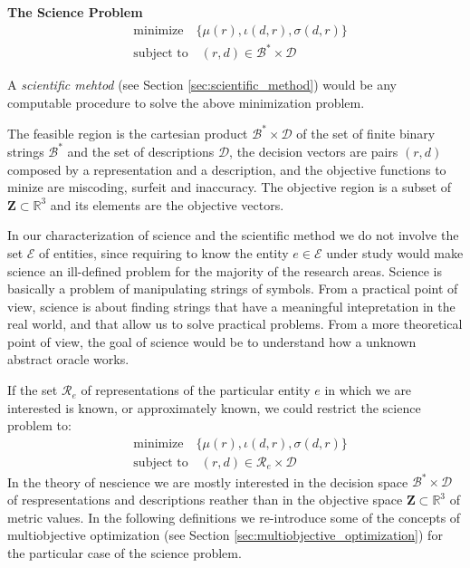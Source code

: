 \begin{tBox}
\textbf{The Science Problem}
\begin{align*}
 & \text{minimize} \quad \{ \mu(r), \iota(d, r), \sigma(d, r)\} \\
 & \text{subject to} \quad (r, d) \in \mathcal{B}^\ast \times \mathcal{D}
\end{align*}
\end{tBox}

A \emph{scientific mehtod} (see Section \ref{sec:scientific_method}) would be any computable procedure to solve the above minimization problem.

The feasible region is the cartesian product $\mathcal{B}^\ast \times \mathcal{D}$ of the set of finite binary strings $\mathcal{B}^\ast$ and the set of descriptions $\mathcal{D}$, the decision vectors are pairs $(r, d)$ composed by a representation and a description, and the objective functions to minize are miscoding, surfeit and inaccuracy. The objective region is a subset of $\mathbf{Z} \subset \mathbb{R}^3$ and its elements are the objective vectors.

In our characterization of science and the scientific method we do not involve the set $\mathcal{E}$ of entities, since requiring to know the entity $e \in \mathcal{E}$ under study would make science an ill-defined problem for the majority of the research areas. Science is basically a problem of manipulating strings of symbols. From a practical point of view, science is about finding strings that have a meaningful intepretation in the real world, and that allow us to solve practical problems. From a more theoretical point of view, the goal of science would be to understand how a unknown abstract oracle works.

If the set $\mathcal{R}_e$ of representations of the particular entity $e$ in which we are interested is known, or approximately known, we could restrict the science problem to:
\begin{align*}
 & \text{minimize} \quad \{ \mu(r), \iota(d, r), \sigma(d, r)\} \\
 & \text{subject to} \quad (r, d) \in \mathcal{R}_e \times \mathcal{D}
\end{align*}
In the theory of nescience we are mostly interested in the decision space $\mathcal{B}^\ast \times \mathcal{D}$ of respresentations and descriptions reather than in the objective space $\mathbf{Z} \subset \mathbb{R}^3$ of metric values. In the following definitions we re-introduce some of the concepts of multiobjective optimization (see Section \ref{sec:multiobjective_optimization}) for the particular case of the science problem.

